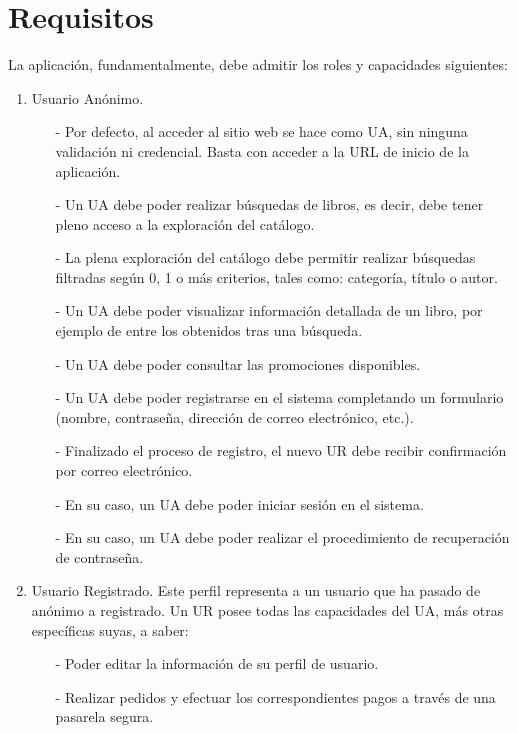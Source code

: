 \documentclass[a4paper,12pt,twoside,openright]{report}
\begin{document}
        \section{Requisitos}
            La aplicación, fundamentalmente, debe admitir los roles y capacidades siguientes:
            \begin{enumerate}
                \item Usuario Anónimo.
                \begin{itemize}
                    \item[-] Por defecto, al acceder al sitio web se hace como UA, sin ninguna validación ni credencial. Basta con acceder a la URL de inicio de la aplicación.
                    \item[-] Un UA debe poder realizar búsquedas de libros, es decir, debe tener pleno acceso a la exploración del catálogo.
                    \item[-] La plena exploración del catálogo debe permitir realizar búsque\-das filtradas según 0, 1 o más criterios, tales como: categoría, título o autor.
                    \item[-] Un UA debe poder visualizar información detallada de un libro, por ejemplo de entre los obtenidos tras una búsqueda.
                    \item[-] Un UA debe poder consultar las promociones disponibles.
                    \item[-] Un UA debe poder registrarse en el sistema completando un formulario (nombre, contraseña, dirección de correo electrónico, etc.).
                    \item[-] Finalizado el proceso de registro, el nuevo UR debe recibir confirmación por correo electrónico.
                    \item[-] En su caso, un UA debe poder iniciar sesión en el sistema.
                    \item[-] En su caso, un UA debe poder realizar el procedimiento de recuperación de contraseña.
                \end{itemize}
                \item Usuario Registrado. Este perfil representa a un usuario que ha pasado de anónimo a registrado. Un UR posee todas las capacidades del UA, más otras específicas suyas, a saber:
                \begin{itemize}
                    \item[-] Poder editar la información de su perfil de usuario.
                    \item[-] Realizar pedidos y efectuar los correspondientes pagos a través de una pasarela segura.

\end{itemize}
\end{enumerate}
\end{document}
